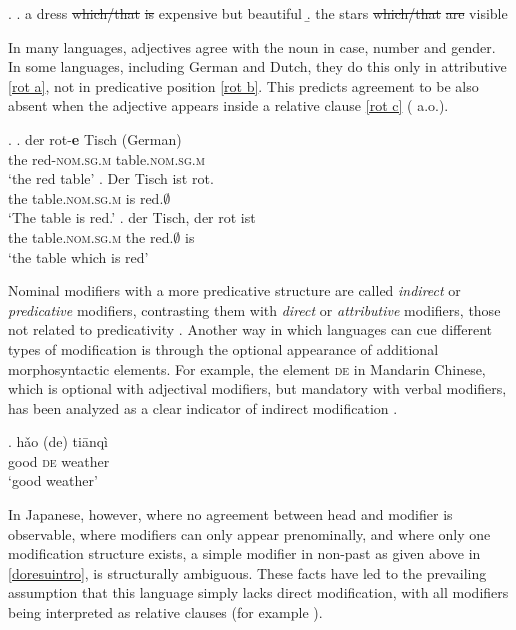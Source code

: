 \ex. \a. a dress \st{which/that} \st{is} expensive but beautiful
\b. the stars \st{which/that} \st{are} visible

In many languages, adjectives agree with the noun in case, number and gender. In some languages, including  German and  Dutch, they do this only in attributive \ref{rot a}, not in predicative position \ref{rot b}. This predicts agreement to be also absent when the adjective appears inside a relative clause \ref{rot c} (\citealt{roehrs:2008:something, belk:2017:attributes, zeijlstra:2020:agree} a.o.).

\ex. \ag. der rot-\textbf{e} Tisch (German)\\
the red-\textsc{nom.sg.m} table.\textsc{nom.sg.m}\\
`the red table’ \label{rot a}
\bg. Der Tisch ist rot.\\
the table.\textsc{nom.sg.m} is red.$\emptyset$\\
`The table is red.’ \label{rot b}
\cg. der Tisch, der rot ist\\
the table.\textsc{nom.sg.m} the red.$\emptyset$ is\\
`the table which is red’ \label{rot c}

Nominal modifiers with a more predicative structure are called \textit{indirect} or \textit{predicative} modifiers, contrasting them with \textit{direct} or \textit{attributive} modifiers, those not related to predicativity \citep{sproat:1991:the, alex:2007:nounphrase, cinque:2010:adj}. Another way in which languages can cue different types of modification is through the optional appearance of additional morphosyntactic elements. For example, the element \textsc{de} in  Mandarin Chinese, which is optional with adjectival modifiers, but mandatory with verbal modifiers, has been analyzed as a clear indicator of indirect modification \citep[571]{sproat:1991:the}.

\exg. h\v{a}o (de) tiānqì\\
good \textsc{de} weather\\
`good weather’ \null \hfill \citep[573]{sproat:1991:the}

In Japanese, however, where no agreement between head and modifier is observable, where modifiers can only appear prenominally, and where only one modification structure exists, a simple modifier in non-past as given above in \ref{doresuintro}, is structurally ambiguous. These facts have led to the prevailing assumption that this language simply lacks direct modification, with all modifiers being interpreted as relative clauses (for example \citealt{kuno:1973:structure, hinds:1988:japanese, whitman:1981:internal, kaplan:1995:the}).

